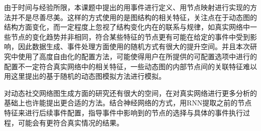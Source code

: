 由于时间与经验所限，本课题中提出的用事件进行定义、用节点映射进行实现的方法并不是尽善尽美。这样的方式使用的是图结构的相关特征，关注点在于动态图的结构方面变化，而一定程度上忽视了结构变化内在的联系与规律，如真实网络中一些节点的变化趋势并非相同，符合某些特征的节点更有可能在给定的事件中受到影响，因此数据生成、事件处理方面使用的随机方式有很大的提升空间。并且本次研究中使用了高度自由化的配置方法，可能使得用户在所提供的可配置选项中进行的配置不一定符合真实网络中的相关特征，一些动态图的内部节点间的关联特征难以用这里提出的基于随机的动态图模拟方法进行模拟。

对动态社交网络图生成方面的研究还有很大的空间，在对真实网络进行更多分析的基础上也许能提出更合适的方法。结合神经网络的方式，用RNN提取之前的节点特征来进行后续事件配置，指导事件中影响到的节点的选择与具体的事件执行过程，可能会有更符合真实情况的结果。